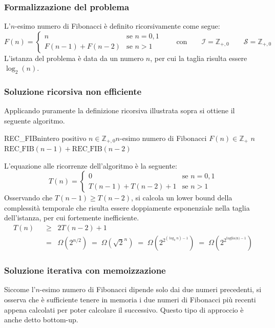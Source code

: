 \subsubsection*{Formalizzazione del problema}
L'\(n\)-esimo numero di Fibonacci è definito ricorsivamente come segue:
\[F(n) = \begin{cases}
	n & \text{se } n = 0,1 \\
	F(n-1) + F(n-2) & \text{se } n > 1
\end{cases} \qquad \text{con} \qquad \mathcal{I} = \mathbb{Z}_{+,0} \qquad \mathcal{S} = \mathbb{Z}_{+,0}\]
L'istanza del problema è data da un numero \(n\), per cui la taglia risulta essere \(\log_2(n)\).

\subsubsection*{Soluzione ricorsiva non efficiente}
Applicando puramente la definizione ricorsiva illustrata sopra si ottiene il seguente algoritmo.

\begin{algo}{REC\_FIB}{n}{intero positivo $n \in \mathbb{Z}_{+,0}$}{$n$-esimo numero di Fibonacci $F(n) \in \mathbb{Z}_{+}$}
		\State \Return \(n\)
	\Else
		\State \Return \(\text{REC\_FIB}(n-1) + \text{REC\_FIB}(n-2)\)
	\EndIf
\end{algo}

\vspace{5pt}

\noindent
L'equazione alle ricorrenze dell'algoritmo è la seguente:
\[T(n) = \begin{cases}
	0 & \text{se } n = 0,1 \\
	T(n-1) + T(n-2) + 1 & \text{se } n > 1
\end{cases}\]
Osservando che \(T(n-1) \geq T(n-2)\), si calcola un lower bound della complessità temporale che risulta essere doppiamente
esponenziale nella taglia dell'istanza, per cui fortemente inefficiente.
\begin{align*}
	T(n) \;\; &\geq \;\; 2T(n-2) + 1 \\[3pt]
	&= \;\; \Omega \! \left( 2^{n/2} \right) \; = \; \Omega \! \left( \sqrt{2}^n \right) \; = \; \Omega \! \left( 2^{2^{(\log_2 n) - 1}} \right) \; = \; \Omega \! \left( 2^{2^{\text{taglia(n)} - 1}} \right)
\end{align*}

\newpage

\subsubsection*{Soluzione iterativa con memoizzazione}
Siccome l'\(n\)-esimo numero di Fibonacci dipende solo dai due numeri precedenti, si osserva che è sufficiente tenere in
memoria i due numeri di Fibonacci più recenti appena calcolati per poter calcolare il successivo. Questo tipo di approccio
è anche detto bottom-up.


